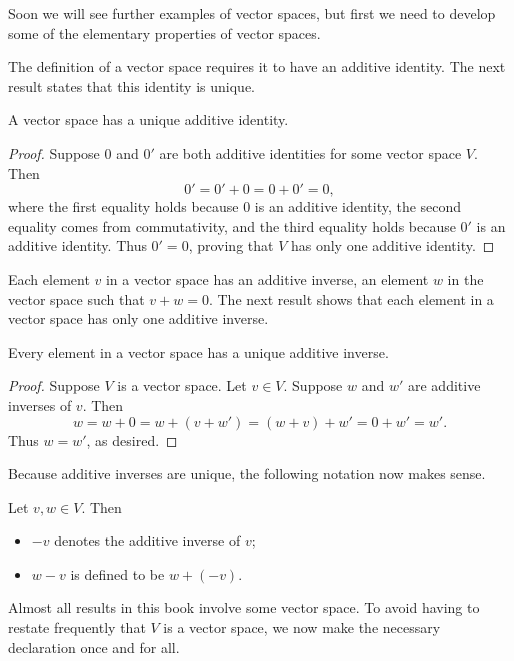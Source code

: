 Soon we will see further examples of vector spaces, but first we need to
develop some of the elementary properties of vector spaces.

The definition of a vector space requires it to have an additive identity. The
next result states that this identity is unique.

\begin{result}\label{ax:1.26}
A vector space has a unique additive identity.
\end{result}

\begin{proof}
Suppose $0$ and $0'$ are both additive identities for some vector space $V$.
Then
\[ 0' = 0'+0 = 0+0' = 0, \]
where the first equality holds because $0$ is an additive identity, the second
equality comes from commutativity, and the third equality holds because $0'$
is an additive identity. Thus $0'=0$, proving that $V$ has only one additive
identity.
\end{proof}

Each element $v$ in a vector space has an additive inverse, an element $w$ in
the vector space such that $v+w=0$. The next result shows that each element in
a vector space has only one additive inverse.

\begin{result}\label{ax:1.27}
Every element in a vector space has a unique additive inverse.
\end{result}

\begin{proof}
Suppose $V$ is a vector space. Let $v\in V$. Suppose $w$ and $w'$ are additive
inverses of $v$. Then
\[ w = w+0 = w+(v+w') = (w+v)+w' = 0+w' = w'. \]
Thus $w=w'$, as desired.
\end{proof}

Because additive inverses are unique, the following notation now makes sense.

\begin{notation}[$-v$, $w-v$]\label{ax:1.28}
Let $v,w\in V$. Then
\begin{itemize}
\item $-v$ denotes the additive inverse of $v$;
\item $w-v$ is defined to be $w+(-v)$.
\end{itemize}
\end{notation}

Almost all results in this book involve some vector space. To avoid having to
restate frequently that $V$ is a vector space, we now make the necessary
declaration once and for all.

